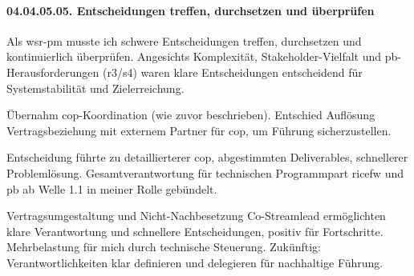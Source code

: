 \paragraph*{04.04.05.05. Entscheidungen treffen, durchsetzen und überprüfen}
\label{para:04.04.05.05_EntscheidungenTreffenDurchsetzenUndÜberprüfen}

\par Als \gls{wsr}-\gls{pm} musste ich schwere Entscheidungen treffen, durchsetzen und kontinuierlich überprüfen. Angesichts Komplexität, Stakeholder-Vielfalt und \gls{pb}-Herausforderungen (\gls{r3}/\gls{s4}) waren klare Entscheidungen entscheidend für Systemstabilität und Zielerreichung.

\par Übernahm \gls{cop}-Koordination (wie zuvor beschrieben). Entschied Auflösung Vertragsbeziehung mit externem Partner für \gls{cop}, um Führung sicherzustellen.

\par Entscheidung führte zu detaillierterer \gls{cop}, abgestimmten Deliverables, schnellerer Problemlösung. Gesamtverantwortung für technischen Programmpart \gls{ricefw} und \gls{pb} ab Welle 1.1 in meiner Rolle gebündelt.

\par Vertragsumgestaltung und Nicht-Nachbesetzung Co-Streamlead ermöglichten klare Verantwortung und schnellere Entscheidungen, positiv für Fortschritte. Mehrbelastung für mich durch technische Steuerung. Zukünftig: Verantwortlichkeiten klar definieren und delegieren für nachhaltige Führung.